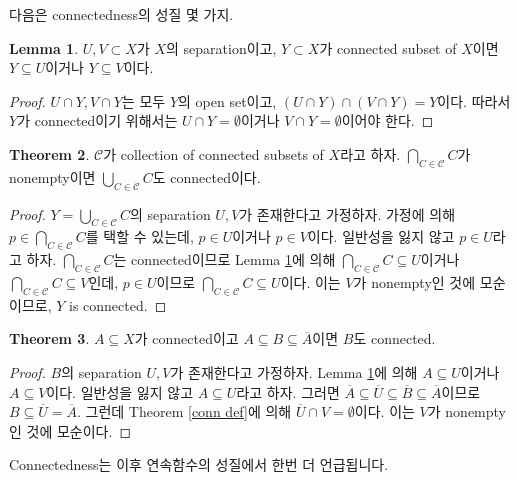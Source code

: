 \documentclass[12pt]{article}
\theoremstyle{definition}
\newtheorem{thm}{Theorem}[section]
\newtheorem{lem}[thm]{Lemma}
\begin{document}
	다음은 connectedness의 성질 몇 가지.
	
	\begin{lem} \label{conn lem}
		\(U, V \subset X\)가 \(X\)의 separation이고, \(Y \subset X\)가 connected subset of \(X\)이면 \(Y \subseteq U\)이거나 \(Y \subseteq V\)이다.
	\end{lem}
	\begin{proof}
		\(U \cap Y, V \cap Y\)는 모두 \(Y\)의 open set이고, \((U \cap Y) \cap (V \cap Y) = Y\)이다. 따라서 \(Y\)가 connected이기 위해서는 \(U \cap Y = \emptyset\)이거나 \(V \cap Y = \emptyset\)이어야 한다.
	\end{proof}
	
	\begin{thm}
		\(\mathcal{C}\)가 collection of connected subsets of \(X\)라고 하자. \(\bigcap_{C \in \mathcal{C}} C\)가 nonempty이면 \(\bigcup_{C \in \mathcal{C}} C\)도 connected이다.
	\end{thm}
	\begin{proof}
		\(Y = \bigcup_{C \in \mathcal{C}} C\)의 separation \(U, V\)가 존재한다고 가정하자. 가정에 의해 \(p \in \bigcap_{C \in \mathcal{C}} C\)를 택할 수 있는데, \(p \in U\)이거나 \(p \in V\)이다. 일반성을 잃지 않고 \(p \in U\)라고 하자. \(\bigcap_{C \in \mathcal{C}} C\)는 connected이므로 Lemma \ref{conn lem}에 의해 \(\bigcap_{C \in \mathcal{C}} C \subseteq U\)이거나 \(\bigcap_{C \in \mathcal{C}} C \subseteq V\)인데, \(p \in U\)이므로 \(\bigcap_{C \in \mathcal{C}} C \subseteq U\)이다. 이는 \(V\)가 nonempty인 것에 모순이므로, \(Y\) is connected.
	\end{proof}
	
	\begin{thm}
		\(A \subseteq X\)가 connected이고 \(A \subseteq B \subseteq \overline{A}\)이면 \(B\)도 connected.
	\end{thm}
	\begin{proof}
		\(B\)의 separation \(U, V\)가 존재한다고 가정하자. Lemma \ref{conn lem}에 의해 \(A \subseteq U\)이거나 \(A \subseteq V\)이다. 일반성을 잃지 않고 \(A \subseteq U\)라고 하자. 그러면 \(\overline{A} \subseteq \overline{U} \subseteq \overline{B} \subseteq \overline{A}\)이므로 \(B \subseteq \overline{U} = \overline{A}\). 그런데 Theorem \ref{conn def}에 의해 \(\overline{U} \cap V = \emptyset\)이다. 이는 \(V\)가 nonempty인 것에 모순이다.
	\end{proof}

Connectedness는 이후 연속함수의 성질에서 한번 더 언급됩니다.

\newpage
\end{document}
